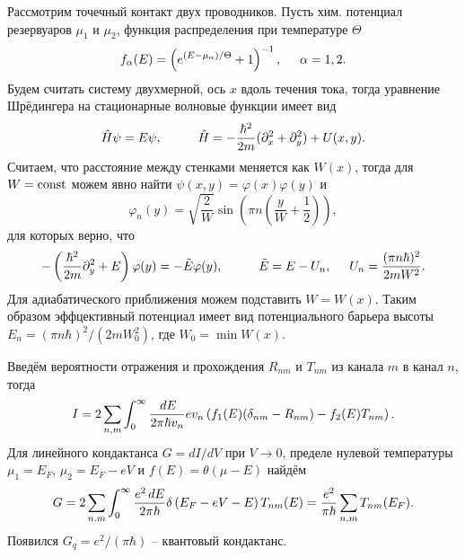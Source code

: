 Рассмотрим точечный контакт двух проводников. Пусть хим. потенциал резервуаров $\mu_1$ и $\mu_2$, функция распределения при температуре $\Theta$
\begin{equation*}
	f_{\alpha}(E) = \left(e^{(E-\mu_{\alpha})/\Theta}+1\right)^{-1},
	\hspace{5 mm} 
	\alpha = 1,2.
\end{equation*}
Будем считать систему двухмерной, ось $x$ вдоль течения тока, тогда уравнение Шрёдингера на стационарные волновые функции имеет вид
\begin{equation*}
	\hat{H} \psi = E \psi,
	\hspace{10 mm} 
	\hat{H} = - \frac{\hbar^2}{2m}(\partial_x^2 + \partial_y^2) + U(x, y).
\end{equation*}
Считаем, что расстояние между стенками меняется как $W(x)$, тогда для $W = \textnormal{const} $ можем явно найти $\psi(x, y) = \varphi(x) \varphi(y)$ и 
\begin{equation*}
	\varphi_n(y) = \sqrt{\frac{2}{W}} \sin\left(
		\pi n\left(\frac{y}{W} + \frac{1}{2}\right)
	\right),
\end{equation*}
для которых верно, что
\begin{equation*}
	-\left(\frac{\hbar^2}{2m} \partial_y^2 + E\right) \varphi(y) = - \tilde{E} \varphi(y),
	\hspace{10 mm} 
	\tilde{E} = E - U_n,
	\hspace{5 mm} 
	U_n = \frac{(\pi n \hbar)^2}{2 m W^2}.
\end{equation*}
Для адиабатического приближения можем подставить $W=W(x)$. Таким образом эффцективный потенциал имеет вид потенциального барьера высоты $E_n = (\pi n \hbar)^2/(2m W_0^2)$, где $W_0 = \min W(x)$. 


Введём вероятности отражения и прохождения $R_{nm}$ и $T_{nm}$ из канала $m$ в канал $n$, тогда
\begin{equation*}
	I = 2 \sum_{n,m} \int_{0}^{\infty} \frac{\, d E}{2 \pi \hbar v_n} e v_n \left(
		f_1(E) (\delta_{nm}-R_{nm}) - f_2(E)T_{nm}
	\right).
\end{equation*}
Для линейного кондактанса $G = dI /dV$ при $V \to 0$, пределе нулевой температуры $\mu_1 = E_F$, $\mu_2 = E_F-eV$ и $f(E) = \theta(\mu-E)$ найдём
\begin{equation*}
	G = 2 \sum_{n.m} \int_{0}^{\infty} \frac{e^2 \, d E}{2 \pi \hbar} \delta\left(
		E_F - eV - E
	\right) T_{nm} (E) = \frac{e^2}{\pi \hbar} \sum_{n,m} T_{nm}(E_F).
\end{equation*}
Появился $G_q = e^2 / (\pi \hbar)$ -- квантовый кондактанс. 



